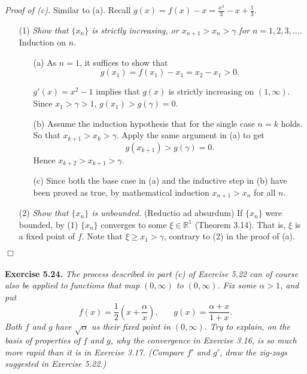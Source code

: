 \documentclass{article}
\begin{document}
\emph{Proof of (c).}
Similar to (a).
Recall $g(x) = f(x) - x = \frac{x^3}{3} - x + \frac{1}{3}$.
\begin{enumerate}
\item[(1)]
\emph{Show that $\{x_n\}$ is strictly increasing,
or $x_{n+1} > x_n > \gamma$ for $n = 1, 2, 3, \ldots$.}
Induction on $n$.
  \begin{enumerate}
  \item[(a)]
  As $n = 1$, it suffices to show that
  \[
    g(x_1) = f(x_1) - x_1 = x_2 - x_1 > 0.
  \]

  $g'(x) = x^2 - 1$ implies that $g(x)$ is strictly increasing on $(1, \infty)$.
  Since $x_1 > \gamma > 1$, $g(x_1) > g(\gamma) = 0$.

  \item[(b)]
  Assume the induction hypothesis that for the single case $n = k$ holds.
  So that $x_{k+1} > x_k > \gamma$.
  Apply the same argument in (a) to get
  \[
    g(x_{k+1}) > g(\gamma) = 0.
  \]
  Hence $x_{k+2} > x_{k+1} > \gamma$.

  \item[(c)]
  Since both the base case in (a) and
  the inductive step in (b) have been proved as true,
  by mathematical induction $x_{n+1} > x_n$ for all $n$.
  \end{enumerate}

\item[(2)]
\emph{Show that $\{x_n\}$ is unbounded.}
(Reductio ad absurdum)
If $\{x_n\}$ were bounded,
by (1) $\{x_n\}$ converges to some $\xi \in \mathbb{R}^1$ (Theorem 3.14).
That is, $\xi$ is a fixed point of $f$.
Note that $\xi \geq x_1 > \gamma$, contrary to (2) in the proof of (a).
\end{enumerate}
$\Box$ \\\\






\textbf{Exercise 5.24.}
\emph{The process described in part (c) of Exercise 5.22 can of course also be applied to
functions that map $(0,\infty)$ to $(0,\infty)$.
Fix some $\alpha > 1$, and put
\[
  f(x) = \frac{1}{2} \left( x + \frac{\alpha}{x} \right), \:\:\:\:\:\:\:\:
  g(x) = \frac{\alpha + x}{1 + x}.
\]
Both $f$ and $g$ have $\sqrt{\alpha}$ as their fixed point in $(0,\infty)$.
Try to explain, on the basis of properties of $f$ and $g$,
why the convergence in Exercise 3.16, is so much more rapid than it is in Exercise 3.17.
(Compare $f'$ and $g'$, draw the zig-zags suggested in Exercise 5.22.)} \\
\end{document}
